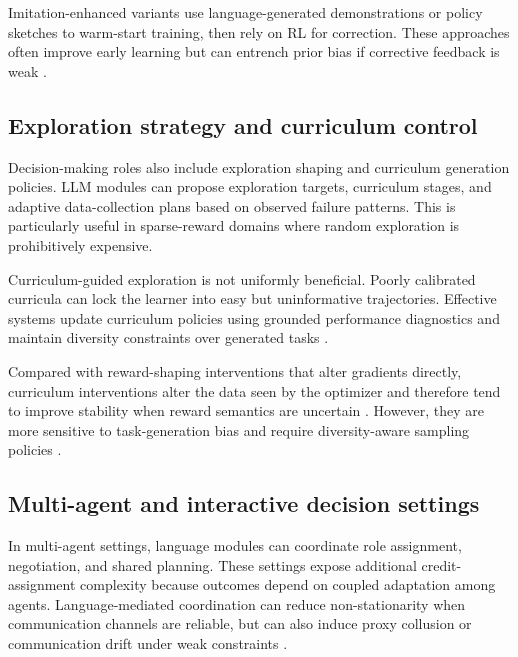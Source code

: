\documentclass[pdflatex,sn-mathphys-num]{sn-jnl}
\begin{document}
Imitation-enhanced variants use language-generated demonstrations or policy sketches to warm-start training, then rely on RL for correction. These approaches often improve early learning but can entrench prior bias if corrective feedback is weak \cite{arxiv_p_2510_13229,arxiv_p_2510_14967,arxiv_p_2602_06554,arxiv_p_2509_26093}.

\subsection{Exploration strategy and curriculum control}
Decision-making roles also include exploration shaping and curriculum generation policies. LLM modules can propose exploration targets, curriculum stages, and adaptive data-collection plans based on observed failure patterns. This is particularly useful in sparse-reward domains where random exploration is prohibitively expensive.

Curriculum-guided exploration is not uniformly beneficial. Poorly calibrated curricula can lock the learner into easy but uninformative trajectories. Effective systems update curriculum policies using grounded performance diagnostics and maintain diversity constraints over generated tasks \cite{arxiv_p_2512_16848,arxiv_p_2602_07906,arxiv_p_2601_16486}.

Compared with reward-shaping interventions that alter gradients directly, curriculum interventions alter the data seen by the optimizer and therefore tend to improve stability when reward semantics are uncertain \cite{arxiv_p_2310_12931,arxiv_p_2510_20867,arxiv_p_2602_11551}. However, they are more sensitive to task-generation bias and require diversity-aware sampling policies \cite{arxiv_p_2512_24653,arxiv_p_2601_18225,arxiv_p_2601_20802}.

\subsection{Multi-agent and interactive decision settings}
In multi-agent settings, language modules can coordinate role assignment, negotiation, and shared planning. These settings expose additional credit-assignment complexity because outcomes depend on coupled adaptation among agents. Language-mediated coordination can reduce non-stationarity when communication channels are reliable, but can also induce proxy collusion or communication drift under weak constraints \cite{arxiv_p_2304_07297,arxiv_p_2310_03903,arxiv_p_2602_08335,arxiv_p_2602_11583}.
\end{document}
